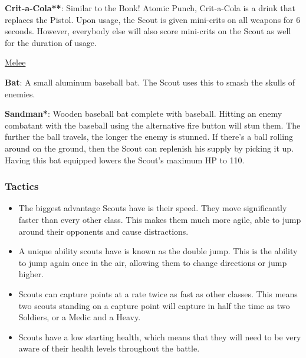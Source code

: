 {\bf Crit-a-Cola**}: Similar to the Bonk! Atomic Punch, Crit-a-Cola is a drink that replaces the Pistol.  Upon usage, the Scout is given mini-crits on all weapons for 6 seconds.  However, everybody else will also score mini-crits on the Scout as well for the duration of usage.

\newpage


\begin {center}
\underline {Melee}
\end {center}

{\bf Bat}: A small aluminum baseball bat. The Scout uses this to smash the skulls of enemies. 

{\bf Sandman*}: Wooden baseball bat complete with baseball. Hitting an enemy combatant with the baseball using the alternative fire button will stun them. The further the ball travels, the longer the enemy is stunned. If there's a ball rolling around on the ground, then the Scout can replenish his supply by picking it up. Having this bat equipped lowers the Scout’s maximum HP to 110. 

\subsubsection {Tactics}
\begin {itemize}
\item The biggest advantage Scouts have is their speed. They move significantly faster than every other class. This makes them much more agile, able to jump around their opponents and cause distractions.

\item A unique ability scouts have is known as the double jump.  This is the ability to jump again once in the air, allowing them to change directions or jump higher.

\item Scouts can capture points at a rate twice as fast as other classes.  This means two scouts standing on a capture point will capture in half the time as two Soldiers, or a Medic and a Heavy.

\item Scouts have a low starting health, which means that they will need to be very aware of their health levels throughout the battle.  
\end {itemize}